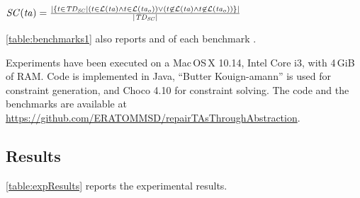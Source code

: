 \begin{tikzborder}{\cite{Gargantini16:validation}}
\begin{tikzborder}{\cite{gargantini_combinatorial_2017}}
\begin{tikzborder}{\cite{gargantini_combinatorial_2017}}
\begin{tikzborder}{\cite{garn2019}}
\begin{tikzborder}{\cite{arcaini2019achieving}}
\begin{tikzborder}{\cite{arcaini2019varivolution}}
\begin{tikzborder}{}
\vspace{4pt}
\centerline{$\mathit{SC}(\mathit{ta}) = \frac{|\{t \in \mathit{TD_{SC}} | (t \in \mathcal{L}(\mathit{ta}) \wedge t \in \mathcal{L}(\mathit{ta}_o)) \vee (t \not\in \mathcal{L}(\mathit{ta}) \wedge t \not\in \mathcal{L}(\mathit{ta}_o)) \}|}{|\mathit{TD_{SC}}|}$}
\vspace{4pt}

\bb \ref{table:benchmarks1} also reports \syntDist and \semConf of each benchmark \initTa.

Experiments have been executed on a Mac\,OS\,X 10.14, Intel Core i3, with 4\,GiB of RAM. Code is implemented in Java,  ``Butter Kouign-amann'' is used for constraint generation, and Choco 4.10 for constraint solving. The code and the benchmarks are available at \url{https://github.com/ERATOMMSD/repairTAsThroughAbstraction}.
\be

\subsection{Results}\label{sec:results1}

\bb
\ref{table:expResults} reports the experimental results.
\be


\end{tikzborder}
\end{tikzborder}
\end{tikzborder}
\end{tikzborder}
\end{tikzborder}
\end{tikzborder}
\end{tikzborder}
